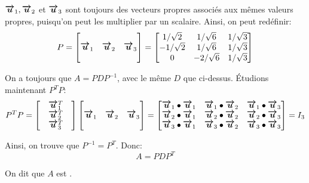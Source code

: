 \documentclass[a4paper]{article}
\begin{document}
{    $\bvec{u}_1, \bvec{u}_2$ et $\bvec{u}_3$ sont toujours des vecteurs propres associés aux mêmes valeurs propres, puisqu'on peut les multiplier par un scalaire. Ainsi, on peut redéfinir:
    \[P = \begin{bmatrix}  &  &  \\ \bvec{u}_1 & \bvec{u}_2 & \bvec{u}_3 \\  &  &  \end{bmatrix} = \begin{bmatrix} 1 / \sqrt{2} & 1 / \sqrt{6} & 1 / \sqrt{3} \\ -1 / \sqrt{2} & 1 / \sqrt{6} & 1 / \sqrt{3} \\ 0 & -2 / \sqrt{6} & 1 / \sqrt{3} \end{bmatrix} \]

    On a toujours que $A = PDP^{-1}$, avec le même $D$ que ci-dessus. Étudions maintenant $P^T P$:
    \[P^T P = \begin{bmatrix}  & \bvec{u}_1^T &  \\  & \bvec{u}_2^T &  \\  & \bvec{u}_3^T &  \end{bmatrix} \begin{bmatrix}  &  &  \\ \bvec{u}_1 & \bvec{u}_2 & \bvec{u}_3 \\  &  &  \end{bmatrix} = \begin{bmatrix} \bvec{u}_1 \dotprod \bvec{u}_1 & \bvec{u}_1 \dotprod \bvec{u}_2 & \bvec{u}_1 \dotprod \bvec{u}_3 \\ \bvec{u}_2 \dotprod \bvec{u}_1 & \bvec{u}_2 \dotprod \bvec{u}_2 & \bvec{u}_2 \dotprod \bvec{u}_3 \\ \bvec{u}_3 \dotprod \bvec{u}_1 & \bvec{u}_3 \dotprod \bvec{u}_2  & \bvec{u}_3 \dotprod \bvec{u}_3\end{bmatrix} = I_3  \]

    Ainsi, on trouve que $P^{-1} = P^T$. Donc:
    \[A = PDP^T\]

    On dit que $A$ est .

    }
\end{document}

